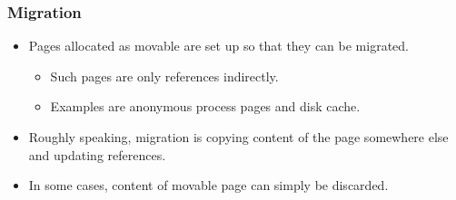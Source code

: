 \begin{frame}[fragile]
  \frametitle{Migration}

  \begin{itemize}
  \item Pages allocated as movable are set up so that they can be
    migrated.
    \begin{itemize}
    \item Such pages are only references indirectly.
    \item Examples are anonymous process pages and disk cache.
    \end{itemize}
  \item Roughly speaking, migration is copying content of the page
    somewhere else and updating references.
  \item In some cases, content of movable page can simply be
    discarded.
  \end{itemize}

\end{frame}

